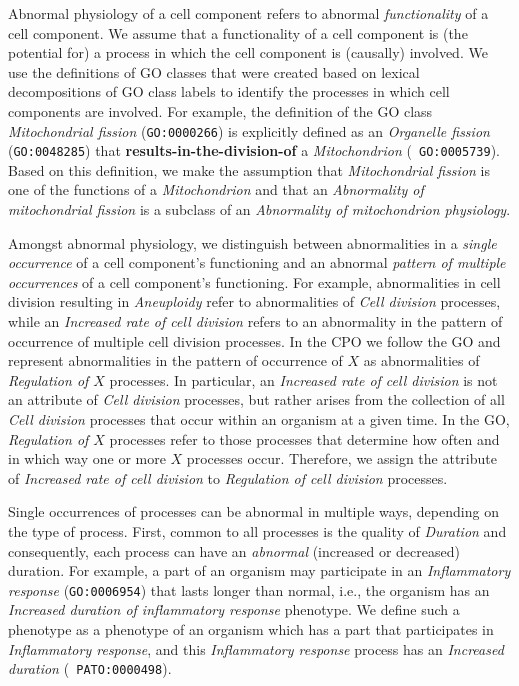 \documentclass{bioinfo}
\renewcommand{\cite}{\citep}
\begin{document}
Abnormal physiology of a cell component refers to abnormal {\em
  functionality} of a cell component. We assume that a functionality
of a cell component is (the potential for) a process in which the cell
component is (causally) involved. We use the definitions of GO classes
that were created based on lexical decompositions of GO class labels
\cite{Mungall2010go, Bada2007a, Ogren2004} to identify the processes
in which cell components are involved. For example, the definition of
the GO class {\em Mitochondrial fission} ({\tt GO:0000266}) is
explicitly defined as an {\em Organelle fission} ({\tt GO:0048285})
that {\bf results-in-the-division-of} a {\em Mitochondrion} ({\tt
  GO:0005739}). Based on this definition, we make the assumption that
{\em Mitochondrial fission} is one of the functions of a {\em
  Mitochondrion} and that an {\em Abnormality of mitochondrial
  fission} is a subclass of an {\em Abnormality of mitochondrion
  physiology}.

Amongst abnormal physiology, we distinguish between abnormalities in a
{\em single occurrence} of a cell component's functioning and an
abnormal {\em pattern of multiple occurrences} of a cell component's
functioning. For example, abnormalities in cell division resulting in
{\em Aneuploidy} refer to abnormalities of {\em Cell division}
processes, while an {\em Increased rate of cell division} refers to an
abnormality in the pattern of occurrence of multiple cell division
processes. In the CPO we follow the GO and represent abnormalities in
the pattern of occurrence of $X$ as abnormalities of {\em Regulation
  of $X$} processes.  In particular, an {\em Increased rate of cell
  division} is not an attribute of {\em Cell division} processes, but
rather arises from the collection of all {\em Cell division} processes
that occur within an organism at a given time. In the GO, {\em
  Regulation of $X$} processes refer to those processes that determine
how often and in which way one or more $X$ processes occur. Therefore,
we assign the attribute of {\em Increased rate of cell division} to
{\em Regulation of cell division} processes.

Single occurrences of processes can be abnormal in multiple ways,
depending on the type of process.
%
First, common to all processes is the quality of {\em Duration} and
consequently, each process can have an {\em abnormal} (increased or
decreased) duration. For example, a part of an organism may
participate in an {\em Inflammatory response} ({\tt GO:0006954}) that
lasts longer than normal, i.e., the organism has an {\em Increased
  duration of inflammatory response} phenotype. We define such a
phenotype as a phenotype of an organism which has a part that
participates in {\em Inflammatory response}, and this {\em
  Inflammatory response} process has an {\em Increased duration} ({\tt
  PATO:0000498}).
\end{document}
